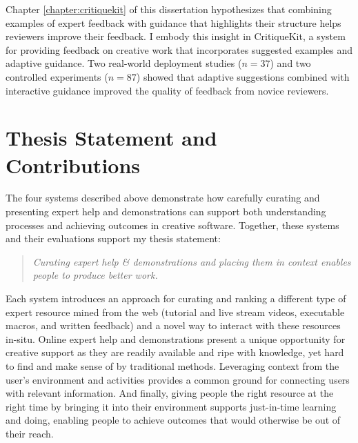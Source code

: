 Chapter \ref{chapter:critiquekit} of this dissertation hypothesizes that combining examples of expert feedback with guidance that highlights their structure helps reviewers improve their feedback. I embody this insight in CritiqueKit, a system for providing feedback on creative work that incorporates suggested examples and adaptive guidance. Two real-world deployment studies ($n=37$) and two controlled experiments ($n=87$) showed that adaptive suggestions combined with interactive guidance improved the quality of feedback from novice reviewers. 

\section{Thesis Statement and Contributions}
The four systems described above demonstrate how carefully curating and presenting expert help and demonstrations can support both understanding processes and achieving outcomes in creative software. Together, these systems and their evaluations support my thesis statement:
\vspace{0.15in}
\begin{quote}
    \textit{Curating expert help \& demonstrations and placing them in context enables people to produce better work.}
\end{quote}

Each system introduces an approach for curating and ranking a different type of expert resource mined from the web (tutorial and live stream videos, executable macros, and written feedback) and a novel way to interact with these resources in-situ. Online expert help and demonstrations present a unique opportunity for creative support as they are readily available and ripe with knowledge, yet hard to find and make sense of by traditional methods. Leveraging context from the user's environment and activities provides a common ground \cite{Clark2006} for connecting users with relevant information. And finally, giving people the right resource at the right time by bringing it into their environment supports just-in-time learning and doing, enabling people to achieve outcomes that would otherwise be out of their reach. 

